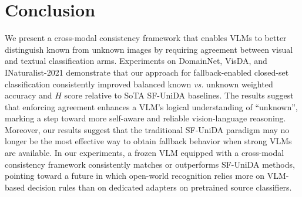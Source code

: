 \documentclass[10pt]{article} %
\begin{document}
\begin{table}[t]
\centering
\caption{Inference Cost and Latency Analysis}
\label{tab:inference_cost}
\small
{}
\vspace{-4mm}
\end{table}
\vspace{-4mm}
\section{Conclusion}\label{sec:conclusion}
We present a cross-modal consistency framework that enables VLMs to better distinguish known from unknown images by requiring agreement between visual and textual classification arms.
Experiments on DomainNet, VisDA, and INaturalist-2021 demonstrate that our approach for fallback-enabled closed-set classification consistently improved balanced known {\em vs.} unknown weighted accuracy and $H$ score relative to SoTA SF-UniDA baselines.
The results suggest that enforcing agreement enhances a VLM's logical understanding of ``unknown'', marking a step toward more self-aware and reliable vision-language reasoning.
Moreover, our results suggest that the traditional SF-UniDA paradigm may no longer be the most effective way to obtain fallback behavior when strong VLMs are available. In our experiments, a frozen VLM equipped with a cross-modal consistency framework consistently matches or outperforms SF-UniDA methods, pointing toward a future in which open-world recognition relies more on VLM-based decision rules than on dedicated adapters on pretrained source classifiers.
\vspace{-3mm}
\end{document}
